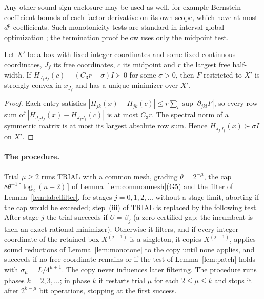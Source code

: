 Any other sound sign enclosure may be used as well, for example Bernstein
coefficient bounds \cite{Garloff1986} of each factor derivative on its own
scope, which have at most $d^p$ coefficients. Such monotonicity tests are
standard in interval global optimization
\cite{Hansen1980,HansenWalster2004,ArayaTrombettoniNeveu2010}; the
termination proof below uses only the midpoint test.

\begin{lemma}\label{lem:patch}
Let $X'$ be a box with fixed integer coordinates and some fixed continuous
coordinates, $J_f$ its free coordinates, $c$ its midpoint and $r$ the largest
free half-width. If $H_{J_fJ_f}(c)-(C_3r+\sigma)I\succ0$ for some
$\sigma>0$, then $F$ restricted to $X'$ is strongly convex in $x_{J_f}$ and has a
unique minimizer over $X'$.
\end{lemma}

\begin{proof}
Each entry satisfies $|H_{jk}(x)-H_{jk}(c)|\le r\sum_l\sup|\partial_{jkl}F|$,
so every row sum of $|H_{J_fJ_f}(x)-H_{J_fJ_f}(c)|$ is at most $C_3r$. The spectral
norm of a symmetric matrix is at most its largest absolute row sum. Hence
$H_{J_fJ_f}(x)\succ\sigma I$ on $X'$.
\end{proof}

\paragraph{The procedure.}
Trial $\mu\ge2$ runs TRIAL with a common mesh, grading $\theta=2^{-\mu}$,
the cap $8\theta^{-1}\lceil\log_2(n+2)\rceil$ of Lemma~\ref{lem:commonmesh}(G5)
and the filter of Lemma~\ref{lem:labelfilter}, for stages $j=0,1,2,\ldots$
without a stage limit, aborting if the cap would be exceeded; step~(iii) of
TRIAL is replaced by the following test. After stage $j$ the trial succeeds
if $U=\beta_j$ (a zero certified gap; the incumbent is then an exact rational
minimizer). Otherwise it filters, and if every integer coordinate of the
retained box $X^{(j+1)}$ is a singleton, it copies $X^{(j+1)}$, applies sound
reductions of Lemma~\ref{lem:monotone} to the copy until none applies, and
succeeds if no free coordinate remains or if the test of
Lemma~\ref{lem:patch} holds with $\sigma_\mu=L/4^{\mu+1}$. The copy never
influences later filtering. The procedure runs phases $k=2,3,\ldots$; in
phase $k$ it restarts trial $\mu$ for each $2\le\mu\le k$ and stops it after
$2^{k-\mu}$ bit operations, stopping at the first success.

